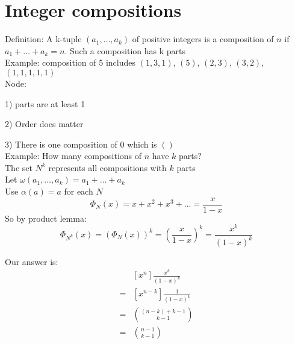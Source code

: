 \documentclass{article}
\begin{document}
\section*{Integer compositions}
Definition: A k-tuple $(a_1,\hdots,a_k)$ of positive integers is a composition of $n$ if $a_1+\hdots+a_k=n$. Such a composition has k parts\\
Example: composition of 5 includes $(1,3,1)$, $(5)$, $(2,3)$, $(3,2)$, $(1,1,1,1,1)$\\
Node: \par
1) parts are at least 1 \par
2) Order does matter \par
3) There is one composition of 0 which is $()$ \\
Example: How many compositions of $n$ have $k$ parts?\\
The set $N^k$ represents all compositions with $k$ parts \\
Let $\omega(a_1,\hdots,a_k)=a_1+\hdots +a_k$ \\
Use $\alpha(a)=a$ for each $N$\\
$$\Phi_N(x)=x+x^2+x^3+\hdots=\frac{x}{1-x}$$
So by product lemma:
$$\Phi_{N^k}(x)=(\Phi_N(x))^k=\left( \frac{x}{1-x} \right)^k=\frac{x^k}{(1-x)^k}$$

Our answer is:
\begin{align*}
&[x^n]\frac{x^k}{(1-x)^k}\\
=&[x^{n-k}]\frac{1}{(1-x)^k}\\
=&\binom{(n-k)+k-1}{k-1}\\
=&\binom{n-1}{k-1}
\end{align*}
\end{document}
